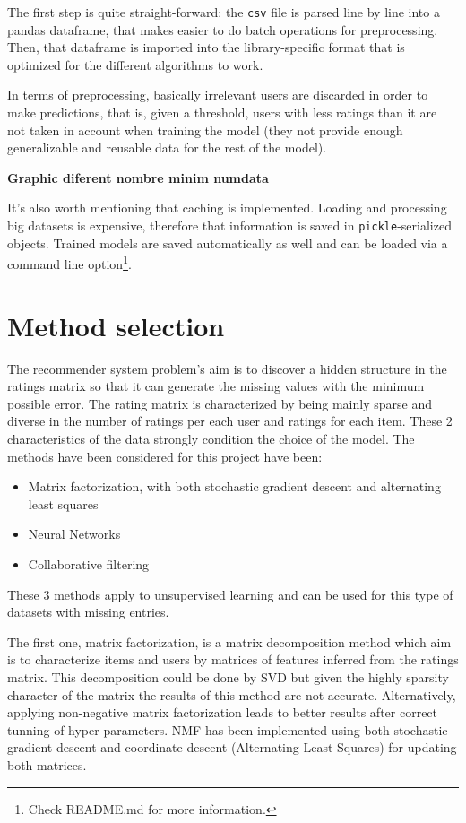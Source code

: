 \documentclass[11pt,conference]{IEEEtran}
\begin{document}
The first step is quite straight-forward: the \verb|csv| file is parsed line by line into a pandas dataframe, that makes easier to do batch operations for preprocessing. Then, that dataframe is imported into the library-specific format that is optimized for the different algorithms to work. 

In terms of preprocessing, basically irrelevant users are discarded in order to make predictions, that is, given a threshold, users with less ratings than it are not taken in account when training the model (they not provide enough generalizable and reusable data for the rest of the model).

\textbf{Graphic diferent nombre minim numdata}

It's also worth mentioning that caching is implemented. Loading and processing big datasets is expensive, therefore that information is saved in \verb|pickle|-serialized objects. Trained models are saved automatically as well and can be loaded via a command line option\footnote{Check README.md for more information.}.

\section{Method selection}

The recommender system problem's aim is to discover a hidden structure in the ratings matrix so that it can generate the missing values with the minimum possible error. The rating matrix is characterized by being mainly sparse and diverse in the number of ratings per each user and ratings for each item. These 2 characteristics of the data strongly condition the choice of the model. The methods have been considered for this project have been:
\begin{itemize}
\item{Matrix factorization, with both stochastic gradient descent and alternating least squares}
\item{Neural Networks}
\item{Collaborative filtering}
\end{itemize}

These 3 methods apply to unsupervised learning and can be used for this type of datasets with missing entries. 

The first one, matrix factorization, is a matrix decomposition method which aim is to characterize items and users by matrices of  features inferred from the ratings matrix. This decomposition could be done by SVD but given the highly sparsity character of the matrix the results of this method are not accurate. Alternatively, applying non-negative matrix factorization leads to better results after correct tunning of hyper-parameters. NMF has been implemented using both stochastic gradient descent and coordinate descent (Alternating Least Squares) for updating both matrices. 
\end{document}

